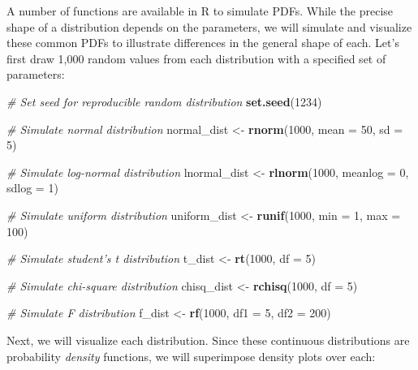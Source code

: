 \documentclass[]{book}
\newenvironment{Shaded}{\begin{snugshade}}{\end{snugshade}}
\newcommand{\CommentTok}[1]{\textcolor[rgb]{0.56,0.35,0.01}{\textit{#1}}}
\newcommand{\DataTypeTok}[1]{\textcolor[rgb]{0.13,0.29,0.53}{#1}}
\newcommand{\DecValTok}[1]{\textcolor[rgb]{0.00,0.00,0.81}{#1}}
\newcommand{\KeywordTok}[1]{\textcolor[rgb]{0.13,0.29,0.53}{\textbf{#1}}}
\newcommand{\NormalTok}[1]{#1}
\newcommand{\StringTok}[1]{\textcolor[rgb]{0.31,0.60,0.02}{#1}}
\begin{document}
A number of functions are available in R to simulate PDFs. While the precise shape of a distribution depends on the parameters, we will simulate and visualize these common PDFs to illustrate differences in the general shape of each. Let's first draw 1,000 random values from each distribution with a specified set of parameters:

\begin{Shaded}
\begin{Highlighting}[]
\CommentTok{# Set seed for reproducible random distribution}
\KeywordTok{set.seed}\NormalTok{(}\DecValTok{1234}\NormalTok{)}

\CommentTok{# Simulate normal distribution}
\NormalTok{normal_dist <-}\StringTok{ }\KeywordTok{rnorm}\NormalTok{(}\DecValTok{1000}\NormalTok{, }\DataTypeTok{mean =} \DecValTok{50}\NormalTok{, }\DataTypeTok{sd =} \DecValTok{5}\NormalTok{)}

\CommentTok{# Simulate log-normal distribution}
\NormalTok{lnormal_dist <-}\StringTok{ }\KeywordTok{rlnorm}\NormalTok{(}\DecValTok{1000}\NormalTok{, }\DataTypeTok{meanlog =} \DecValTok{0}\NormalTok{, }\DataTypeTok{sdlog =} \DecValTok{1}\NormalTok{)}

\CommentTok{# Simulate uniform distribution}
\NormalTok{uniform_dist <-}\StringTok{ }\KeywordTok{runif}\NormalTok{(}\DecValTok{1000}\NormalTok{, }\DataTypeTok{min =} \DecValTok{1}\NormalTok{, }\DataTypeTok{max =} \DecValTok{100}\NormalTok{) }

\CommentTok{# Simulate student's t distribution}
\NormalTok{t_dist <-}\StringTok{ }\KeywordTok{rt}\NormalTok{(}\DecValTok{1000}\NormalTok{, }\DataTypeTok{df =} \DecValTok{5}\NormalTok{)}

\CommentTok{# Simulate chi-square distribution}
\NormalTok{chisq_dist <-}\StringTok{ }\KeywordTok{rchisq}\NormalTok{(}\DecValTok{1000}\NormalTok{, }\DataTypeTok{df =} \DecValTok{5}\NormalTok{)}

\CommentTok{# Simulate F distribution}
\NormalTok{f_dist <-}\StringTok{ }\KeywordTok{rf}\NormalTok{(}\DecValTok{1000}\NormalTok{, }\DataTypeTok{df1 =} \DecValTok{5}\NormalTok{, }\DataTypeTok{df2 =} \DecValTok{200}\NormalTok{)}
\end{Highlighting}
\end{Shaded}

Next, we will visualize each distribution. Since these continuous distributions are probability \emph{density} functions, we will superimpose density plots over each:
\end{document}
